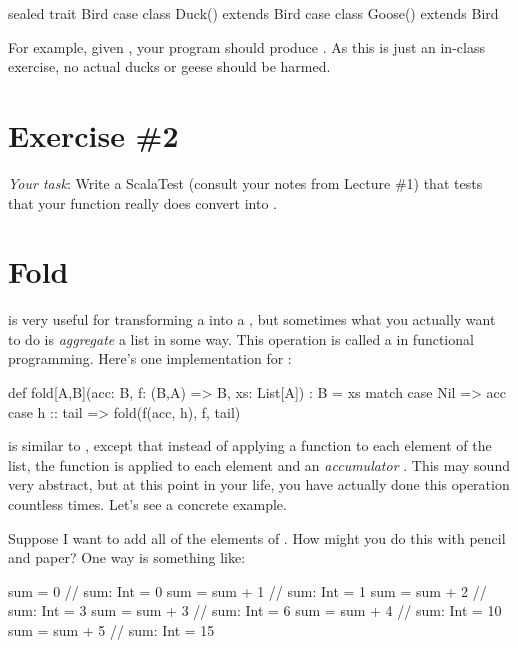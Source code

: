 \documentclass{book}
\begin{document}
\begin{scalacode}
sealed trait Bird
case class Duck() extends Bird
case class Goose() extends Bird
\end{scalacode}

For example, given , your program should produce .  As this is just an in-class exercise, no actual ducks or geese should be harmed.

\section{Exercise \#2}

\emph{Your task}: Write a ScalaTest (consult your notes from Lecture \#1) that tests that your function really does convert  into .

\section{Fold}

 is very useful for transforming a  into a , but sometimes what you actually want to do is \emph{aggregate} a list in some way.  This operation is called a  in functional programming.  Here's one implementation for :

\begin{scalacode}
def fold[A,B](acc: B, f: (B,A) => B, xs: List[A]) : B = {
  xs match {
    case Nil => acc
    case h :: tail => fold(f(acc, h), f, tail)
  }
}
\end{scalacode}

 is similar to , except that instead of applying a function to each element of the list, the function  is applied to each element and an \emph{accumulator} .  This may sound very abstract, but at this point in your life, you have actually done this operation countless times.  Let's see a concrete example.

Suppose I want to add all of the elements of .  How might you do this with pencil and paper?  One way is something like:

\begin{scalacode}
sum = 0
// sum: Int = 0
sum = sum + 1
// sum: Int = 1
sum = sum + 2
// sum: Int = 3
sum = sum + 3
// sum: Int = 6
sum = sum + 4
// sum: Int = 10
sum = sum + 5
// sum: Int = 15
\end{scalacode}
\end{document}

